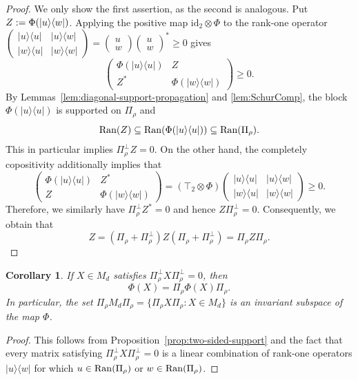 \documentclass[11pt,reqno]{amsart}
\newtheorem{corollary}[theorem]{Corollary}
\theoremstyle{definition}
\theoremstyle{definition}
\theoremstyle{definition}
\theoremstyle{definition}
\newcommand{\la}{\langle}
\newcommand{\ra}{\rangle}
\newcommand{\id}{\mathrm{id}}
\newcommand{\proj}[1]{|#1\rangle\langle #1|}
\begin{document}
\begin{proof}
We only show the first assertion, as the second is analogous. Put $Z:=\Phi(\ket{u}\!\bra{w})$. Applying the positive map $\id_2\otimes \Phi$ to the rank-one operator
$\begin{pmatrix}
\proj{u}& |u\ra\la w|\\
|w\ra\la u|&\proj{w}
\end{pmatrix} = \begin{pmatrix}
u \\ w
\end{pmatrix}
\begin{pmatrix}
u \\ w
\end{pmatrix}^* \geq 0$ gives
    $$\begin{pmatrix}
 \Phi(\proj{u})& Z\\
 Z^*&\Phi(\proj{w})
 \end{pmatrix}\geq 0.$$
By Lemmas~\ref{lem:diagonal-support-propagation} and \ref{lem:SchurComp}, the block $\Phi(|u\ra\la u|)$ is
supported on $\Pi_{\rho}$ and
    $${\rm Ran}(Z)\subseteq {\rm Ran}(\Phi(|u\ra\la u|))\subseteq {\rm Ran}(\Pi_\rho).$$
This in particular implies $\Pi_{\rho}^{\perp} Z = 0$. On the other hand, the completely copositivity additionally implies that 
    $$\begin{pmatrix}
 \Phi(\proj{u})& Z^*\\
 Z&\Phi(\proj{w})
 \end{pmatrix} = (\top_2\otimes \Phi)\begin{pmatrix}
\proj{u}& |u\ra\la w|\\
|w\ra\la u|&\proj{w}
\end{pmatrix}\geq 0.$$
Therefore, we similarly have $\Pi_{\rho}^{\perp}Z^*=0$ and hence $Z\Pi_{\rho}^{\perp} = 0$.
Consequently, we obtain that
    $$Z = (\Pi_{\rho}+\Pi_{\rho}^{\perp})Z (\Pi_{\rho}+\Pi_{\rho}^{\perp}) =\Pi_{\rho}Z\Pi_{\rho}.$$
\end{proof}

\begin{corollary}\label{cor:linear-support-form}
If $X\in M_d$ satisfies $\Pi_{\rho}^{\perp}X\Pi_{\rho}^{\perp}=0$, then 
    $$\Phi(X)=\Pi_{\rho}\Phi(X)\Pi_{\rho}.$$
In particular, the set $\Pi_{\rho}M_d\Pi_{\rho}=\{\Pi_{\rho}X\Pi_{\rho}:X\in M_d\}$ is an invariant subspace of the map $\Phi$.
\end{corollary}

\begin{proof}
This follows from
Proposition~\ref{prop:two-sided-support} and the fact that every matrix satisfying $\Pi_{\rho}^{\perp}X\Pi_{\rho}^{\perp}=0$ is a linear combination of rank-one operators $|u\ra\la w|$ for which $u\in {\rm Ran}(\Pi_{\rho})$ or $w\in {\rm Ran}(\Pi_{\rho})$.
\end{proof}
\end{document}
